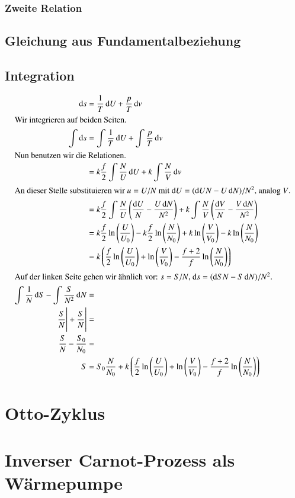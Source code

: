 \subsubsection{Zweite Relation}

\subsection{Gleichung aus Fundamentalbeziehung}

\subsection{Integration}

\begin{align*}
    \dif s &= \frac 1T \dif U + \frac pT \dif v \\
    \intertext{%
        Wir integrieren auf beiden Seiten.
    }
    \int \dif s &= \int \frac 1T \dif U + \int \frac pT \dif v \\
    \intertext{%
        Nun benutzen wir die Relationen.
    }
    &= k \frac f2 \int \frac NU \dif U + k \int \frac NV \dif v \\
    \intertext{%
        An dieser Stelle substituieren wir $u = U/N$ mit $\dif U = (\dif U N -
        U \dif N)/N^2$, analog $V$.
    }
    &= k \frac f2 \int \frac NU \del{\frac{\dif U}{N} - \frac{U \dif N}{N^2}} + k \int \frac NV \del{\frac{\dif V}{N} - \frac{V \dif N}{N^2}} \\
    &= k \frac f2 \ln\del{\frac U{U_0}} - k \frac f2 \ln\del{\frac N{N_0}} + k \ln\del{\frac V{V_0}} - k \ln\del{\frac N{N_0}} \\
    &= k \del{\frac f2 \ln\del{\frac U{U_0}} + \ln\del{\frac V{V_0}} - \frac{f + 2}f \ln\del{\frac N{N_0}}} \\
    \intertext{%
        Auf der linken Seite gehen wir ähnlich vor: $s = S/N$, $\dif s = (\dif
        S N - S \dif N)/N^2$.
    }
    \int \frac 1N \dif S - \int \frac S{N^2} \dif N &= \\
    \eval{\frac SN} + \eval{\frac SN} &= \\
    \frac SN - \frac{S_0}{N_0} &= \\
    S &= S_0 \frac{N}{N_0} + k \del{\frac f2 \ln\del{\frac U{U_0}} + \ln\del{\frac V{V_0}} - \frac{f + 2}f \ln\del{\frac N{N_0}}}
\end{align*}

\section{Otto-Zyklus}

\section{Inverser Carnot-Prozess als Wärmepumpe}

\subsection{}

\subsection{}


